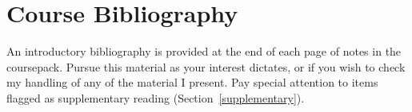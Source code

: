 \documentclass[titlepage]{article}
\begin{document}
\section{Course Bibliography}
\label{bibliography}

An introductory bibliography is provided at the end of each page of
notes in the coursepack. Pursue this material as your interest dictates,
or if you wish to check my handling of any of the material I present.
Pay special attention to items flagged as supplementary reading
(Section~\ref{supplementary}).
\end{document}
